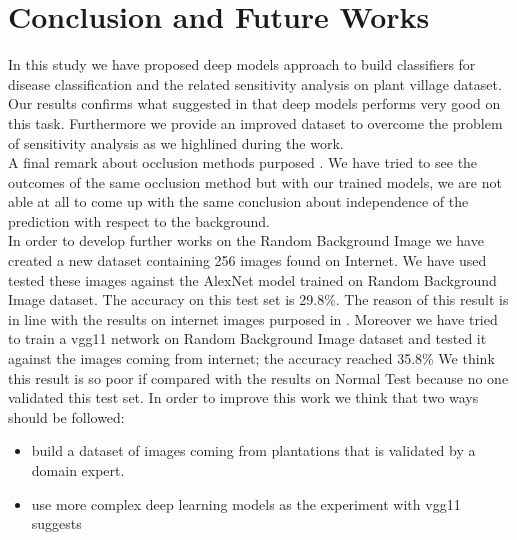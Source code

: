 \section{Conclusion and Future Works}
In this study we have proposed deep models approach to build classifiers for disease classification and the related sensitivity analysis on plant village dataset. Our results confirms what suggested in \cite{ref11} that deep models performs very good on this task. Furthermore we provide an improved dataset to overcome the problem of sensitivity analysis as we highlined during the work.
\\\indent A final remark about occlusion methods purposed \cite{ref11}. We have tried to see the outcomes of the same occlusion method but with our trained models, we are not able at all to come up with the same conclusion about independence of the prediction with respect to the background.
\\\indent In order to develop further works on the Random Background Image we have created a new dataset containing 256 images  found on Internet. We have used tested these images against the AlexNet model trained on Random Background Image dataset. The accuracy on this test set is 29.8\%. The reason of this result is in line with the results on internet images purposed in \cite{ref10}. Moreover we have tried to train a vgg11 network on Random Background Image dataset and tested it against the images coming from internet; the accuracy reached 35.8\%
We think this result is so poor if compared with the results on Normal Test because no one validated this test set. In order to improve this work we think that two ways should be followed:
\begin{itemize}
	\item{build a dataset of images coming from plantations that is validated by a domain expert.}
	\item{use more complex deep learning models as the experiment with vgg11 suggests}
\end{itemize}
